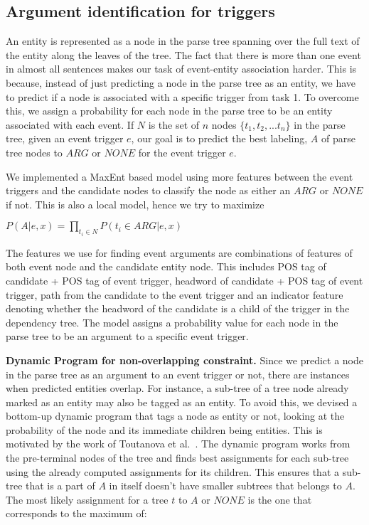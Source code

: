 \subsection{Argument identification for triggers}
An entity is represented as a node in the parse tree spanning over the full text of the entity along the leaves of the tree. The fact that there is more than one event in almost all sentences makes our task of event-entity association harder. This is because, instead of just predicting a node in the parse tree as an entity, we have to predict if a node is associated with a specific trigger from task 1. To overcome this, we assign a probability for each node in the parse tree to be an entity associated with each event. If $N$ is the set of $n$ nodes $\{t_1, t_2, ... t_n\}$ in the parse tree, given an event trigger $e$, our goal is to predict the best labeling, $A$ of parse tree nodes to $ARG$ or $NONE$ for the event trigger $e$.

We implemented a MaxEnt based model using more features between the event triggers and the candidate nodes to classify the node as either an $ARG$ or $NONE$ if not. This is also a local model, hence we try to maximize

$P(A | e, x) = \prod_{t_{i}\in N} P(t_{i} \in ARG | e, x) $

The features we use for finding event arguments are combinations of features of both event node and the candidate entity node. This includes POS tag of candidate + POS tag of event trigger, headword of candidate + POS tag of event trigger, path from the candidate to the event trigger and an indicator feature denoting whether the headword of the candidate is a child of the trigger in the dependency tree. The model assigns a probability value for each node in the parse tree to be an argument to a specific event trigger.

{\bf Dynamic Program for non-overlapping constraint.} Since we predict a node in the parse tree as an argument to an event trigger or not, there are instances when predicted entities overlap. For instance, a sub-tree of a tree node already marked as an entity may also be tagged as an entity. To avoid this, we devised a bottom-up dynamic program that tags a node as entity or not, looking at the probability of the node and its immediate children being entities. This is motivated by the work of Toutanova et al.~. The dynamic program works from the pre-terminal nodes of the tree and finds best assignments for each sub-tree using the already computed assignments for its children. This ensures that a sub-tree that is a part of $A$ in itself doesn't have smaller subtrees that belongs to $A$. The most likely assignment for a tree $t$  to $A$ or $NONE$ is the one that corresponds to the maximum of:

